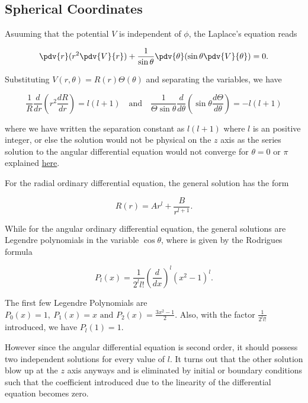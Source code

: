 \documentclass[english,a4paper,12pt]{report}
\begin{document}

\subsection{Spherical Coordinates}

Asuuming that the potential \(V\) is independent of \(\phi \), the Laplace's equation reads 

\begin{equation}
    \pdv{r} (r^2 \pdv{V}{r} ) + \frac{1}{\sin \theta } \pdv{\theta } (\sin \theta \pdv{V}{\theta } ) = 0.
\end{equation}

Substituting \(V(r,\theta ) = R(r)\Theta (\theta )\) and separating the variables, we have 

\begin{equation}
    \frac{1}{R} \frac{d}{dr} (r^2 \frac{dR}{dr} ) = l(l+1) ~~~ \text{ and } ~~~ \frac{1}{\Theta \sin \theta } \frac{d}{d\theta} (\sin \theta \frac{d\Theta}{d\theta} ) = -l(l+1)	
\end{equation}

where we have written the separation constant as \(l(l+1)\) where \(l\) is an positive integer, or else the solution would not be physical on the \(z\) axis as the series solution to the angular differential equation would not converge for \(\theta = 0 \text { or }  \pi \) explained \href{https://jfoadi.me.uk/documents/lecture_mathphys2_08.pdf}{here}.

For the radial ordinary differential equation, the general solution has the form

\begin{equation}
    R(r) = Ar^{l} + \frac{B}{r^{l+1} } .
\end{equation}

While for the angular ordinary differential equation, the general solutions are Legendre polynomials in the variable \(\cos \theta \), where is given by the Rodrigues formula

\begin{equation}
    P_{l}(x) = \frac{1}{2^{l} l!} \left(\frac{d}{dx} \right)^{l} (x^2 - 1)^{l} . 
\end{equation}

The first few Legendre Polynomials are \(P_0(x) = 1, ~P_1(x) = x \text{ and } P_2(x) = \frac{3x^2 - 1}{2} \). Also, with the factor \(\frac{1}{2^{l} l!} \) introduced, we have \(P_{l} (1) = 1\).  

However since the angular differential equation is second order, it should possess two independent solutions for every value of \(l\). It turns out that the other solution blow up at the \(z\) axis anyways and is eliminated by initial or boundary conditions such that the coefficient introduced due to the linearity of the differential equation becomes zero.
\end{document}
